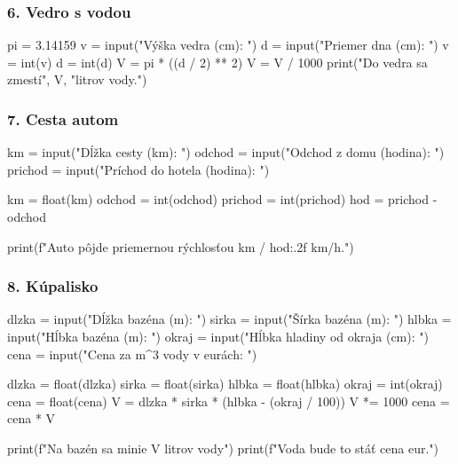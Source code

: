 \subsubsection*{6. Vedro s vodou}
\begin{solution}
pi = 3.14159
v = input("Výška vedra (cm): ")
d = input("Priemer dna (cm): ")
v = int(v)
d = int(d)
V = pi * ((d / 2) ** 2)
V = V / 1000
print("Do vedra sa zmestí", V, "litrov vody.")
\end{solution}

\subsubsection*{7. Cesta autom}
\begin{solution}
km = input("Dĺžka cesty (km): ")
odchod = input("Odchod z domu (hodina): ")
prichod = input("Príchod do hotela (hodina): ")

km = float(km)
odchod = int(odchod)
prichod = int(prichod)
hod = prichod - odchod

print(f"Auto pôjde priemernou rýchlosťou {km / hod:.2f} km/h.")
\end{solution}

\subsubsection*{8. Kúpalisko}
\begin{solution}
dlzka = input("Dĺžka bazéna (m): ")
sirka = input("Šírka bazéna (m): ")
hlbka = input("Hĺbka bazéna (m): ")
okraj = input("Hĺbka hladiny od okraja (cm): ")
cena = input("Cena za m^3 vody v eurách: ")

dlzka = float(dlzka)
sirka = float(sirka)
hlbka = float(hlbka)
okraj = int(okraj)
cena = float(cena)
V = dlzka * sirka * (hlbka - (okraj / 100))
V *= 1000
cena = cena * V

print(f"Na bazén sa minie {V} litrov vody")
print(f"Voda bude to stáť {cena} eur.")
\end{solution}

